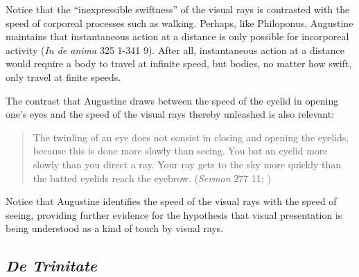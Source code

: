 \documentclass[12pt]{article}
\begin{document}
Notice that the ``inexpressible swiftness'' of the visual rays is contrasted with the speed of corporeal processes such as walking. Perhaps, like Philoponus, Augustine maintains that instantaneous action at a distance is only possible for incorporeal activity (\emph{In de anima} 325 1-341 9). After all, instantaneous action at a distance would require a body to travel at infinite speed, but bodies, no matter how swift, only travel at finite speeds. 

The contrast that Augustine draws between the speed of the eyelid in opening one's eyes and the speed of the visual rays thereby unleashed is also relevant:
\begin{quote}
	The twinling of an eye does not consist in closing and opening the eyelids, because this is done more slowly than seeing. You bat an eyelid more slowly than you direct a ray. Your ray gets to the sky more quickly than the batted eyelids reach the eyebrow. (\emph{Sermon} 277 11; \citealt[39]{Hill:1994aa})
\end{quote}
Notice that Augustine identifies the speed of the visual rays with the speed of seeing, providing further evidence for the hypothesis that visual presentation is being understood as a kind of touch by visual rays.



\subsection{\emph{De Trinitate}} %
\label{sub:_emph_de_trinitate}
\end{document}
